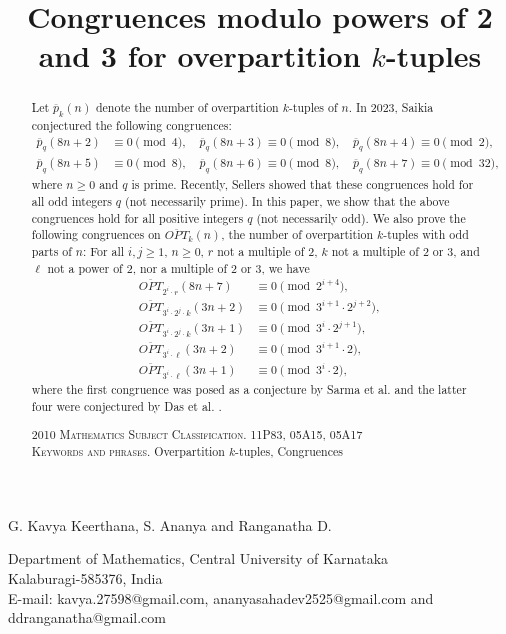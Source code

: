\documentclass[12pt,reqno,a4paper]{amsart}
\numberwithin{equation}{section}
\begin{document}
 \title[{\tiny Congruences modulo powers of 2 and 3 for overpartition $k$-tuples}]{Congruences modulo powers of 2 and 3 for overpartition $k$-tuples}
 \maketitle
\begin{center}
{G. Kavya Keerthana, S. Ananya and Ranganatha D.\\
 \vspace{.5cm}

Department of Mathematics, Central University of Karnataka\\
Kalaburagi-585376, India\\
E-mail: kavya.27598@gmail.com, ananyasahadev2525@gmail.com and ddranganatha@gmail.com}
 \end{center}
\begin{abstract} Let $\overline{p}_{k}(n)$ denote the number of overpartition $k$-tuples of $n$. In 2023, Saikia \cite{saikia} conjectured the following congruences: 
\begin{align*} 
\overline{p}_{q}(8n+2)& \equiv 0 \pmod{4},\quad
\overline{p}_{q}(8n+3)\equiv 0 \pmod{8},\quad 
\overline{p}_{q}(8n+4) \equiv 0 \pmod{2},\\
\overline{p}_{q}(8n+5)& \equiv 0 \pmod{8},\quad 
\overline{p}_{q}(8n+6) \equiv 0 \pmod{8},\quad
\overline{p}_{q}(8n+7)\equiv 0 \pmod{32},
\end{align*}
where $n\geq0$ and $q$ is prime. Recently, Sellers \cite{sellers2024elementary} showed that these congruences hold for all odd integers $q$ (not necessarily prime). In this paper,  we show that the above congruences hold for all positive integers $q$ (not necessarily odd). We also prove the following congruences on $\overline{OPT}_k(n)$, the number of overpartition $k$-tuples with odd parts of $n$: For all $i,j\geq 1$, $n\geq 0$,   $r$ not a multiple of 2, $k$ not a multiple of 2 or 3, and $\ell$ not a power of 2,  nor a multiple of 2 or 3, we have
\begin{align*}
\overline{OPT}_{2^i\cdot r}(8n+7)& \equiv 0 \pmod{2^{i+4}},\\
 \overline{OPT}_{3^i\cdot 2^j\cdot k}(3n+2)& \equiv 0 \pmod{3^{i+1}\cdot 2^{j+2}},\\
  \overline{OPT}_{3^i\cdot 2^j\cdot k}(3n+1)& \equiv 0 \pmod{3^{i}\cdot 2^{j+1}},\\
\overline{OPT}_{3^i\cdot \ell}(3n+2)& \equiv 0 \pmod{3^{i+1}\cdot 2},\\
 \overline{OPT}_{3^i\cdot \ell}(3n+1)& \equiv 0 \pmod{3^{i}\cdot 2},\end{align*}
 where the first congruence was posed as a conjecture by Sarma et al. \cite{saikiasarma} and the latter four were conjectured by Das et al. \cite{DSS}.
   
\vspace{2mm}
\noindent\textsc{2010 Mathematics Subject Classification.} 11P83, 05A15, 05A17\\
\vspace{2mm}
\noindent\textsc{Keywords and phrases.} Overpartition $k$-tuples, Congruences
\end{abstract}
\end{document}
